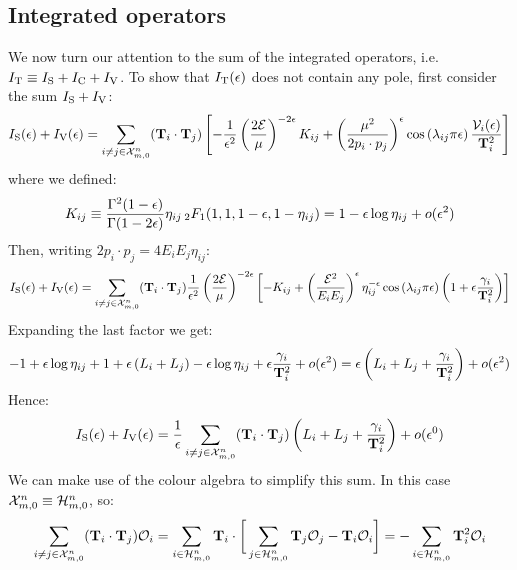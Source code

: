 \subsection{Integrated operators}

We now turn our attention to the sum of the integrated operators, i.e. $ I_\text{T} \equiv I_\text{S} + I_\text{C} + I_\text{V} $. To show that $ I_\text{T}(\epsilon) $ does not contain any pole, first consider the sum $ I_\text{S} + I_\text{V} $:
\begin{equation*}
  I_\text{S}(\epsilon) + I_\text{V}(\epsilon) = \sum_{i \neq j \in \mathcal{X}^{n}_{m,0}} (\mathbf{T}_i \cdot \mathbf{T}_j) \left[ - \frac{1}{\epsilon^2} \left( \frac{2\mathcal{E}}{\mu} \right)^{-2\epsilon} K_{ij} + \left( \frac{\mu^2}{2p_i \cdot p_j} \right)^\epsilon \cos \left( \lambda_{ij} \pi \epsilon \right) \frac{\mathcal{V}_i(\epsilon)}{\mathbf{T}_i^2} \right]
\end{equation*}
where we defined:
\begin{equation}
  K_{ij} \equiv \frac{\Gamma^2(1-\epsilon)}{\Gamma(1-2\epsilon)} \eta_{ij} \,{_2F_1}(1,1,1-\epsilon,1-\eta_{ij}) = 1 - \epsilon \log \eta_{ij} + o(\epsilon^2)
\end{equation}
Then, writing $ 2p_i \cdot p_j = 4E_i E_j \eta_{ij} $:
\begin{equation*}
  I_\text{S}(\epsilon) + I_\text{V}(\epsilon) = \sum_{i \neq j \in \mathcal{X}^{n}_{m,0}} (\mathbf{T}_i \cdot \mathbf{T}_j) \frac{1}{\epsilon^2} \left( \frac{2\mathcal{E}}{\mu} \right)^{-2\epsilon} \left[ - K_{ij} + \left( \frac{\mathcal{E}^2}{E_i E_j} \right)^\epsilon \eta_{ij}^{-\epsilon} \cos \left( \lambda_{ij} \pi \epsilon \right) \left( 1 + \epsilon \frac{\gamma_i}{\mathbf{T}_i^2} \right) \right]
\end{equation*}
Expanding the last factor we get:
\begin{equation*}
  - 1 + \epsilon \log \eta_{ij} + 1 + \epsilon \left( L_i + L_j \right) - \epsilon \log \eta_{ij} + \epsilon \frac{\gamma_i}{\mathbf{T}_i^2} + o(\epsilon^2) = \epsilon \left( L_i + L_j + \frac{\gamma_i}{\mathbf{T}_i^2} \right) + o(\epsilon^2)
\end{equation*}
Hence:
\begin{equation}
  I_\text{S}(\epsilon) + I_\text{V}(\epsilon) = \frac{1}{\epsilon} \sum_{i \neq j \in \mathcal{X}^{n}_{m,0}} (\mathbf{T}_i \cdot \mathbf{T}_j) \left( L_i + L_j + \frac{\gamma_i}{\mathbf{T}_i^2} \right) + o(\epsilon^0)
  \label{eq:isv-exp}
\end{equation}
We can make use of the colour algebra to simplify this sum. In this case $ \mathcal{X}^{n}_{m,0} \equiv \mathcal{H}^{n}_{m,0} $, so:
\begin{equation}
  \sum_{i \neq j \in \mathcal{X}^{n}_{m,0}} (\mathbf{T}_i \cdot \mathbf{T}_j) \mathcal{O}_i = \sum_{i \in \mathcal{H}^{n}_{m,0}} \mathbf{T}_i \cdot \bigg[ \sum_{j \in \mathcal{H}^{n}_{m,0}} \mathbf{T}_j \mathcal{O}_j - \mathbf{T}_i \mathcal{O}_i \bigg] = - \sum_{i \in \mathcal{H}^{n}_{m,0}} \mathbf{T}_i^2 \mathcal{O}_i
  \label{eq:co-alg}
\end{equation}
